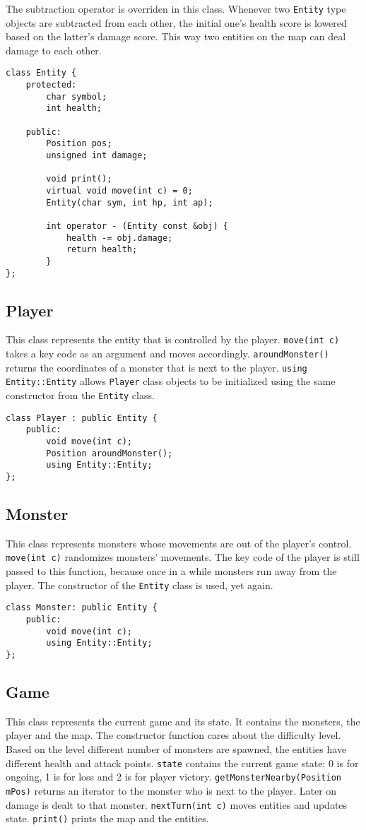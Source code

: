 \documentclass[a4paper,12pt]{article}
\begin{document}
The subtraction operator is overriden in this class. Whenever two \verb|Entity| type objects are subtracted from each other, the initial one's health score is lowered based on the latter's damage score. This way two entities on the map can deal damage to each other.

\begin{lstlisting}
class Entity {
	protected:
		char symbol;
		int health;

	public:
		Position pos;
		unsigned int damage;

		void print();
		virtual void move(int c) = 0;
		Entity(char sym, int hp, int ap);

		int operator - (Entity const &obj) {
			health -= obj.damage;
			return health;
		}
};
\end{lstlisting}

\newpage

\subsection{Player}
This class represents the entity that is controlled by the player. \verb|move(int c)| takes a key code as an argument and moves accordingly. \verb|aroundMonster()| returns the coordinates of a monster that is next to the player. \verb|using Entity::Entity| allows \verb|Player| class objects to be initialized using the same constructor from the \verb|Entity| class.
\begin{lstlisting}
class Player : public Entity {
	public:
		void move(int c);
		Position aroundMonster();
		using Entity::Entity;
};
\end{lstlisting}

\subsection{Monster}
This class represents monsters whose movements are out of the player's control. \verb|move(int c)| randomizes monsters' movements. The key code of the player is still passed to this function, because once in a while monsters run away from the player. The constructor of the \verb|Entity| class is used, yet again.
\begin{lstlisting}
class Monster: public Entity {
	public:
		void move(int c);
		using Entity::Entity;
};
\end{lstlisting}

\newpage

\subsection{Game}
This class represents the current game and its state. It contains the monsters, the player and the map. The constructor function cares about the difficulty level. Based on the level different number of monsters are spawned, the entities have different health and attack points. \verb|state| contains the current game state: 0 is for ongoing, 1 is for loss and 2 is for player victory. \verb|getMonsterNearby(Position mPos)| returns an iterator to the monster who is next to the player. Later on damage is dealt to that monster. \verb|nextTurn(int c)| moves entities and updates state. \verb|print()| prints the map and the entities.
\end{document}
